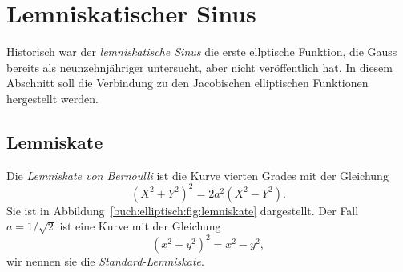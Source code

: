 %
%
%
\section{Lemniskatischer Sinus
\label{buch:elliptisch:section:lemniskate}}
Historisch war der {\em lemniskatische Sinus} die erste ellptische
Funktion, die Gauss bereits als neunzehnjähriger untersucht, aber nicht 
veröffentlich hat.
In diesem Abschnitt soll die Verbindung zu den Jacobischen
elliptischen Funktionen hergestellt werden.

%
%
\subsection{Lemniskate
\label{buch:gemotrie:subsection:lemniskate}}
Die {\em Lemniskate von Bernoulli} ist die Kurve vierten Grades
mit der Gleichung
%
\begin{equation}
(X^2+Y^2)^2 = 2a^2(X^2-Y^2).
\label{buch:elliptisch:eqn:lemniskate}
\end{equation}
Sie ist in Abbildung~\ref{buch:elliptisch:fig:lemniskate}
dargestellt.
Der Fall $a=1/\!\sqrt{2}$ ist eine Kurve mit der Gleichung
\begin{equation}
(x^2+y^2)^2 = x^2-y^2,
\label{buch:elliptisch:eqn:standard-lemniskate}
\end{equation}
wir nennen sie die {\em Standard-Lemniskate}.

